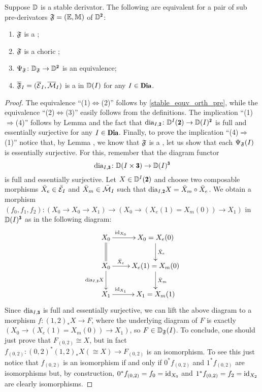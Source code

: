 \begin{theorem}\label{stable_equv_orth}
Suppose $\mathbb{D}$ is a stable derivator. The following are equivalent for a pair of sub pre-derivators $\mathfrak{F}=(\mathbb E,\mathbb M)$  of $\D^{\due}$:
\begin{enumerate}%
\item $\mathfrak{F}$ is a \dfs;
\item \color{black}$\mathfrak{F}$ is a choric \dfs;\color{black}
\item $\Psi_\F\colon \D_\F\to \D^{\due}$ is an equivalence;
\item $\overline{\mathfrak{F}}_I=(\overline{\mathcal{E}}_I,\overline{\mathcal{M}}_I)$ is a \hfs in $\mathbb{D}(I)$ for any $I\in\Dia$.
\end{enumerate}
\end{theorem}
\begin{proof}
The equivalence ``(1)$\Leftrightarrow$(2)'' follows by \athm \ref{stable_equv_orth_pre}, while the equivalence ``(2)$\Leftrightarrow$(3)'' easily follows from the definitions. The implication ``(1)$\Rightarrow$(4)'' follows by Lemma  and the fact that $\dia_{I,\due}\colon \D^I(\due)\to \D(I)^{\due}$ is full and essentially surjective for any $I\in \Dia$. Finally, to prove the implication ``(4)$\Rightarrow$(1)'' notice that, by Lemma , we know that $\mathfrak{F}$ is a  \cpfs, let us show that each $\Psi_{\mathfrak{F}}(I)$ is essentially surjective. For this, remember that the diagram functor
\[
\dia_{I,\tre}\colon \D(I\times \tre)\to \D(I)^{\tre}
\]
is full and essentially surjective. Let $X\in \D^I(\due)$ and choose two composable morphisms $\bar X_e\in \bar {\mathcal{E}}_I$ and $\bar X_m\in \bar {\mathcal{M}}_I$ such that $\dia_{I,\due}X=\bar X_m\circ \bar X_e$. We obtain a morphism $(f_0,f_1,f_2)\colon (X_0\to X_0\to X_1)\to (X_0\to (X_e(1)=X_m(0))\to X_1)$ in $\D(I)^{\tre}$ as in the following diagram:
\[
\xymatrix{
X_0\ar@{=}[d]\ar[r]^(.3){\id_{X_0}}&X_0= X_e(0)\ar[d]^{\bar X_e}\\
X_0\ar[r]^(.3){\bar X_e}\ar[d]_{\dia_{I,\due}X}&X_e(1)=X_m(0)\ar[d]^{\bar X_m}\\
X_1\ar[r]^(.3){\id_{X_1}}&X_1=X_m(1)
}
\]
Since $\dia_{I,\tre}$ is full and essentially surjective, we can lift the above diagram to a morphism $f\colon (1,2)_*X\to F$, where the underlying diagram of $F$ is exactly $(X_0\to (X_e(1)=X_m(0))\to X_1)$, so $F\in \mathbb{D}_{\mathfrak{F}}(I)$. To conclude, one should just prove that $F_{(0,2)}\cong X$, but in fact $f_{(0,2)}\colon (0,2)^*(1,2)_*X(\cong X)\to F_{(0,2)}$ is an isomorphism. To see this just notice that $f_{(0,2)}$ is an isomorphism if and only if $0^*f_{(0,2)}$ and $1^*f_{(0,2)}$ are isomorphisms but, by construction, $0^*f_{(0,2)}=f_0=\operatorname{id}_{X_0}$ and $1^*f_{(0,2)}=f_2=\operatorname{id}_{X_2}$ are clearly isomorphisms.\qedhere
\end{proof}



